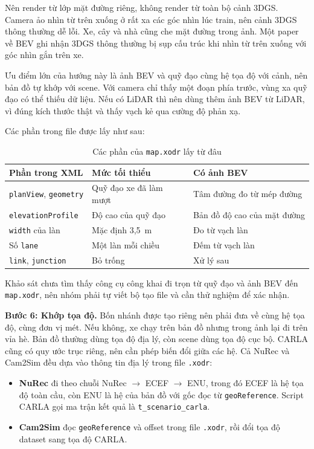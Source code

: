 Nên render từ lớp mặt đường riêng, không render từ toàn bộ cảnh 3DGS. Camera ảo nhìn từ trên xuống ở rất xa các góc nhìn lúc train, nên cảnh 3DGS thông thường dễ lỗi. Xe, cây và nhà cũng che mặt đường trong ảnh. Một paper về BEV ghi nhận 3DGS thông thường bị sụp cấu trúc khi nhìn từ trên xuống với góc nhìn gắn trên xe.

Ưu điểm lớn của hướng này là ảnh BEV và quỹ đạo cùng hệ tọa độ với cảnh, nên bản đồ tự khớp với scene. Với camera chỉ thấy một đoạn phía trước, vùng xa quỹ đạo có thể thiếu dữ liệu.
Nếu có LiDAR thì nên dùng thêm ảnh BEV từ LiDAR, vì đúng kích thước thật và thấy vạch kẻ qua cường độ phản xạ.

Các phần trong file được lấy như sau:

\begin{table}[H]
  \centering
  \small
  \caption{Các phần của \texttt{map.xodr} lấy từ đâu}
  \begin{tabularx}{\linewidth}{>{\raggedright\arraybackslash}p{4cm} >{\raggedright\arraybackslash}X >{\raggedright\arraybackslash}X}
    \toprule
    \textbf{Phần trong XML} & \textbf{Mức tối thiểu} & \textbf{Có ảnh BEV} \\
    \midrule
    \texttt{planView}, \texttt{geometry} & Quỹ đạo xe đã làm mượt & Tâm đường đo từ mép đường \\
    \addlinespace
    \texttt{elevationProfile} & Độ cao của quỹ đạo & Bản đồ độ cao của mặt đường \\
    \addlinespace
    \texttt{width} của làn & Mặc định 3,5~m & Đo từ vạch làn \\
    \addlinespace
    Số \texttt{lane} & Một làn mỗi chiều & Đếm từ vạch làn \\
    \addlinespace
    \texttt{link}, \texttt{junction} & Bỏ trống & Xử lý sau \\
    \bottomrule
  \end{tabularx}
\end{table}

Khảo sát chưa tìm thấy công cụ công khai đi trọn từ quỹ đạo và ảnh BEV đến \texttt{map.xodr}, nên nhóm phải tự viết bộ tạo file và cần thử nghiệm để xác nhận.

\textbf{Bước 6: Khớp tọa độ.}
Bốn nhánh được tạo riêng nên phải đưa về cùng hệ tọa độ, cùng đơn vị mét. Nếu không, xe chạy trên bản đồ nhưng trong ảnh lại đi trên vỉa hè.
Bản đồ thường dùng tọa độ địa lý, còn scene dùng tọa độ cục bộ. CARLA cũng có quy ước trục riêng, nên cần phép biến đổi giữa các hệ.
Cả NuRec và Cam2Sim đều dựa vào thông tin địa lý trong file \texttt{.xodr}:
\begin{itemize}
  \item \textbf{NuRec} đi theo chuỗi NuRec $\to$ ECEF $\to$ ENU, trong đó ECEF là hệ tọa độ toàn cầu, còn ENU là hệ của bản đồ với gốc đọc từ \texttt{geoReference}. Script CARLA gọi ma trận kết quả là \texttt{t\_\allowbreak scenario\_\allowbreak carla}.
  \item \textbf{Cam2Sim} đọc \texttt{geoReference} và offset trong file \texttt{.xodr}, rồi đổi tọa độ dataset sang tọa độ CARLA.
\end{itemize}

